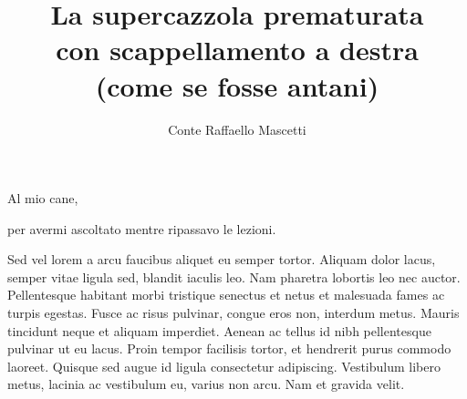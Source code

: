 \documentclass[target=mst,aauheader=,style=]{thud}
\title{La supercazzola prematurata \\ con scappellamento a destra \\ (come se fosse antani)}
\author{Conte Raffaello Mascetti}
\begin{document}
\begin{dedication}
	Al mio cane,\par per avermi ascoltato mentre ripassavo le lezioni.
\end{dedication}

\acknowledgements
Sed vel lorem a arcu faucibus aliquet eu semper tortor. Aliquam dolor lacus, semper vitae ligula sed, blandit iaculis leo. Nam pharetra lobortis leo nec auctor. Pellentesque habitant morbi tristique senectus et netus et malesuada fames ac turpis egestas. Fusce ac risus pulvinar, congue eros non, interdum metus. Mauris tincidunt neque et aliquam imperdiet. Aenean ac tellus id nibh pellentesque pulvinar ut eu lacus. Proin tempor facilisis tortor, et hendrerit purus commodo laoreet. Quisque sed augue id ligula consectetur adipiscing. Vestibulum libero metus, lacinia ac vestibulum eu, varius non arcu. Nam et gravida velit.


\end{document}
